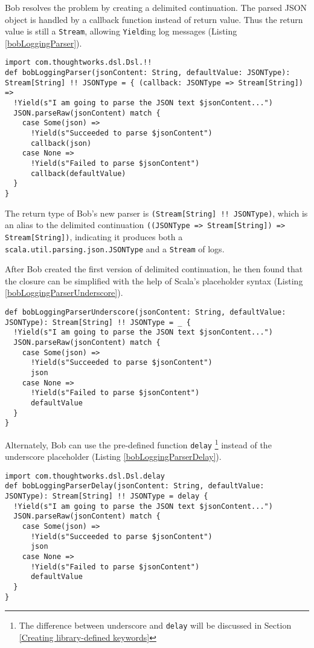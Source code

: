 Bob resolves the problem by creating a delimited continuation. The parsed JSON object is handled by a callback function instead of return value. Thus the return value is still a \lstinline{Stream}, allowing \lstinline{Yield}ing log messages (Listing \ref{bobLoggingParser}).

\begin{lstlisting}[caption={The implementation of Bob's logging parser},label={bobLoggingParser}]
import com.thoughtworks.dsl.Dsl.!!
def bobLoggingParser(jsonContent: String, defaultValue: JSONType): Stream[String] !! JSONType = { (callback: JSONType => Stream[String]) =>
  !Yield(s"I am going to parse the JSON text $jsonContent...")
  JSON.parseRaw(jsonContent) match {
    case Some(json) =>
      !Yield(s"Succeeded to parse $jsonContent")
      callback(json)
    case None =>
      !Yield(s"Failed to parse $jsonContent")
      callback(defaultValue)
  }
}
\end{lstlisting}

The return type of Bob's new parser is \lstinline{(Stream[String] !! JSONType)}, which is an alias to the delimited continuation \lstinline{((JSONType => Stream[String]) => Stream[String])}, indicating it produces both a \lstinline{scala.util.parsing.json.JSONType} and a \lstinline{Stream} of logs.

After Bob created the first version of delimited continuation, he then found that the closure can be simplified with the help of Scala's placeholder syntax (Listing \ref{bobLoggingParserUnderscore}).

\begin{lstlisting}[caption={The implementation of Bob's logging parser, the underscore placeholder version},label={bobLoggingParserUnderscore}]
def bobLoggingParserUnderscore(jsonContent: String, defaultValue: JSONType): Stream[String] !! JSONType = _ {
  !Yield(s"I am going to parse the JSON text $jsonContent...")
  JSON.parseRaw(jsonContent) match {
    case Some(json) =>
      !Yield(s"Succeeded to parse $jsonContent")
      json
    case None =>
      !Yield(s"Failed to parse $jsonContent")
      defaultValue
  }
}
\end{lstlisting}

Alternately, Bob can use the pre-defined function \lstinline{delay} \footnote{The difference between underscore and \lstinline{delay} will be discussed in Section \ref{Creating library-defined keywords}} instead of the underscore placeholder (Listing \ref{bobLoggingParserDelay}). 

\begin{lstlisting}[caption={The implementation of Bob's logging parser, the delay version},label={bobLoggingParserDelay}]
import com.thoughtworks.dsl.Dsl.delay
def bobLoggingParserDelay(jsonContent: String, defaultValue: JSONType): Stream[String] !! JSONType = delay {
  !Yield(s"I am going to parse the JSON text $jsonContent...")
  JSON.parseRaw(jsonContent) match {
    case Some(json) =>
      !Yield(s"Succeeded to parse $jsonContent")
      json
    case None =>
      !Yield(s"Failed to parse $jsonContent")
      defaultValue
  }
}
\end{lstlisting}

